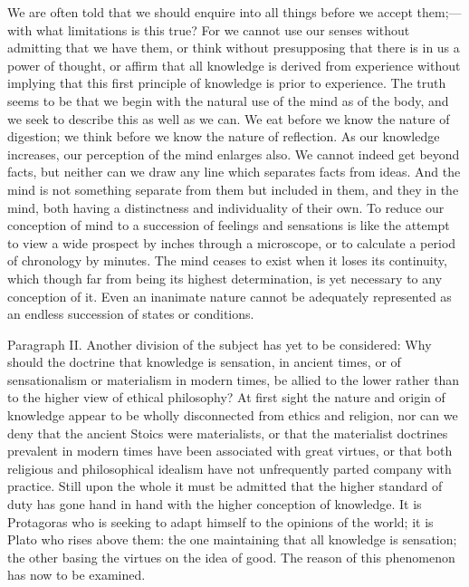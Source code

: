 \documentclass[11pt,letter]{article}
\begin{document}
\par  We are often told that we should enquire into all things before we accept them;—with what limitations is this true? For we cannot use our senses without admitting that we have them, or think without presupposing that there is in us a power of thought, or affirm that all knowledge is derived from experience without implying that this first principle of knowledge is prior to experience. The truth seems to be that we begin with the natural use of the mind as of the body, and we seek to describe this as well as we can. We eat before we know the nature of digestion; we think before we know the nature of reflection. As our knowledge increases, our perception of the mind enlarges also. We cannot indeed get beyond facts, but neither can we draw any line which separates facts from ideas. And the mind is not something separate from them but included in them, and they in the mind, both having a distinctness and individuality of their own. To reduce our conception of mind to a succession of feelings and sensations is like the attempt to view a wide prospect by inches through a microscope, or to calculate a period of chronology by minutes. The mind ceases to exist when it loses its continuity, which though far from being its highest determination, is yet necessary to any conception of it. Even an inanimate nature cannot be adequately represented as an endless succession of states or conditions.

\par  Paragraph II. Another division of the subject has yet to be considered: Why should the doctrine that knowledge is sensation, in ancient times, or of sensationalism or materialism in modern times, be allied to the lower rather than to the higher view of ethical philosophy? At first sight the nature and origin of knowledge appear to be wholly disconnected from ethics and religion, nor can we deny that the ancient Stoics were materialists, or that the materialist doctrines prevalent in modern times have been associated with great virtues, or that both religious and philosophical idealism have not unfrequently parted company with practice. Still upon the whole it must be admitted that the higher standard of duty has gone hand in hand with the higher conception of knowledge. It is Protagoras who is seeking to adapt himself to the opinions of the world; it is Plato who rises above them: the one maintaining that all knowledge is sensation; the other basing the virtues on the idea of good. The reason of this phenomenon has now to be examined.
\end{document}

